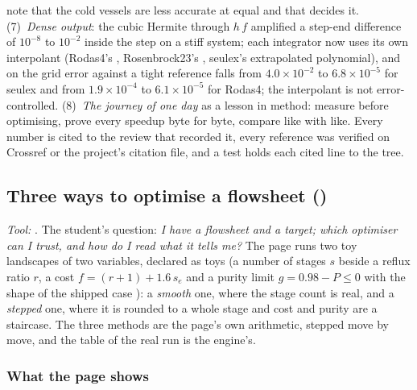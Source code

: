 \documentclass[11pt,a4paper]{article}
\begin{document}
note that the cold vessels are less accurate at equal  and that
 decides it.
(7)~\emph{Dense output}: the cubic Hermite through $h\,f$ amplified a
step-end difference of $10^{-8}$ to $10^{-2}$ inside the step on a stiff
system; each integrator now uses its own interpolant (Rodas4's
, Rosenbrock23's , seulex's extrapolated
polynomial), and on  the grid error against a tight reference
falls from $4.0\times10^{-2}$ to $6.8\times10^{-5}$ for seulex and from
$1.9\times10^{-4}$ to $6.1\times10^{-5}$ for Rodas4; the interpolant is not
error-controlled.  (8)~\emph{The journey of one
day} as a lesson in method: measure before optimising, prove every speedup
byte for byte, compare like with like.  Every number is cited to the review
that recorded it, every reference was verified on Crossref or the project's
citation file, and a test holds each cited line to the tree.

\subsection*{Three ways to optimise a flowsheet \quad()}\label{sec:edu-optimizers}
\textit{\small Tool:} .  The student's question:
\emph{I have a flowsheet and a target; which optimiser can I trust, and how do
I read what it tells me?}  The page runs two toy landscapes of two variables,
declared as toys (a number of stages $s$ beside a reflux ratio $r$, a cost $f=(r+1)+1.6\,s_e$ and a
purity limit $g=0.98-P\le 0$ with the shape of the shipped case
): a \emph{smooth} one, where the stage count is
real, and a \emph{stepped} one, where it is rounded to a whole stage and cost
and purity are a staircase.  The three methods are the page's own arithmetic,
stepped move by move, and the table of the real run is the engine's.

\subsubsection*{What the page shows}
\end{document}

